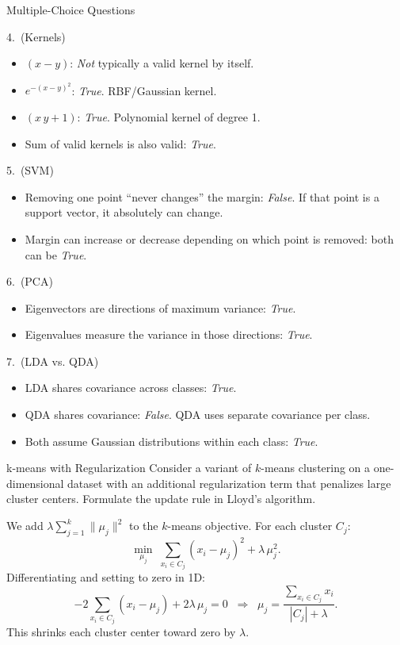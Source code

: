 \documentclass{article}
\begin{document}
\begin{exercise}{Multiple-Choice Questions}
\begin{solution}
    4.\ (Kernels)
    \begin{itemize}
      \item $(x-y)$: \emph{Not} typically a valid kernel by itself.
      \item $e^{-(x - y)^2}$: \emph{True}. RBF/Gaussian kernel.
      \item $(x\,y + 1)$: \emph{True}. Polynomial kernel of degree 1.
      \item Sum of valid kernels is also valid: \emph{True}.
    \end{itemize}

    5.\ (SVM)
    \begin{itemize}
      \item Removing one point “never changes” the margin: \emph{False}. If that point is a support vector, it absolutely can change.
      \item Margin can increase or decrease depending on which point is removed: both can be \emph{True}.
    \end{itemize}

    6.\ (PCA)
    \begin{itemize}
      \item Eigenvectors are directions of maximum variance: \emph{True}.
      \item Eigenvalues measure the variance in those directions: \emph{True}.
    \end{itemize}

    7.\ (LDA vs. QDA)
    \begin{itemize}
      \item LDA shares covariance across classes: \emph{True}.
      \item QDA shares covariance: \emph{False}. QDA uses separate covariance per class.
      \item Both assume Gaussian distributions within each class: \emph{True}.
    \end{itemize}
  \end{solution}
\end{exercise}

\begin{exercise}{k-means with Regularization}
  Consider a variant of $k$-means clustering on a one-dimensional dataset with an additional regularization term that penalizes large cluster centers. Formulate the update rule in Lloyd's algorithm.

  \begin{solution}
    We add $\lambda \sum_{j=1}^k \|\mu_j\|^2$ to the $k$-means objective. For each cluster $C_j$:
    \[
      \min_{\mu_j} \;\sum_{x_i \in C_j} (x_i - \mu_j)^2 + \lambda \,\mu_j^2.
    \]
    Differentiating and setting to zero in 1D:
    \[
      -2\sum_{x_i \in C_j} (x_i - \mu_j) + 2\lambda \,\mu_j = 0
      \;\;\Longrightarrow\;\;
      \mu_j = \frac{\sum_{x_i \in C_j} x_i}{|C_j| + \lambda}.
    \]
    This shrinks each cluster center toward zero by $\lambda$.
  \end{solution}
\end{exercise}
\end{document}
